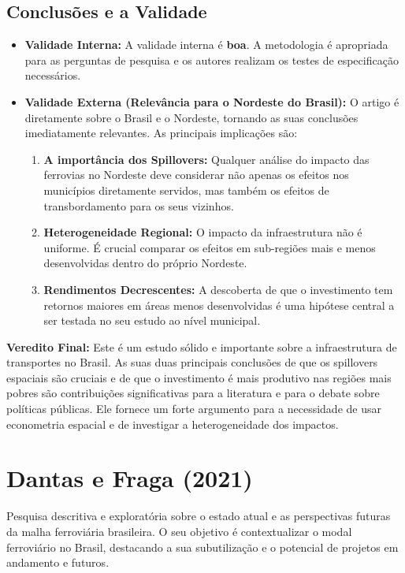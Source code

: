 \documentclass[12pt, a4paper]{article}
\begin{document}
\subsection{Conclusões e a Validade}
\begin{itemize}
    \item \textbf{Validade Interna:} A validade interna é \textbf{boa}. A metodologia é apropriada para as perguntas de pesquisa e os autores realizam os testes de especificação necessários.
    \item \textbf{Validade Externa (Relevância para o Nordeste do Brasil):} O artigo é diretamente sobre o Brasil e o Nordeste, tornando as suas conclusões imediatamente relevantes. As principais implicações são:
        \begin{enumerate}
            \item \textbf{A importância dos Spillovers:} Qualquer análise do impacto das ferrovias no Nordeste deve considerar não apenas os efeitos nos municípios diretamente servidos, mas também os efeitos de transbordamento para os seus vizinhos.
            \item \textbf{Heterogeneidade Regional:} O impacto da infraestrutura não é uniforme. É crucial comparar os efeitos em sub-regiões mais e menos desenvolvidas dentro do próprio Nordeste.
            \item \textbf{Rendimentos Decrescentes:} A descoberta de que o investimento tem retornos maiores em áreas menos desenvolvidas é uma hipótese central a ser testada no seu estudo ao nível municipal.
        \end{enumerate}
\end{itemize}

\noindent\textbf{Veredito Final:} Este é um estudo sólido e importante sobre a infraestrutura de transportes no Brasil. As suas duas principais conclusões de que os spillovers espaciais são cruciais e de que o investimento é mais produtivo nas regiões mais pobres são contribuições significativas para a literatura e para o debate sobre políticas públicas. Ele fornece um forte argumento para a necessidade de usar econometria espacial e de investigar a heterogeneidade dos impactos.

\section{Dantas e Fraga (2021)}
Pesquisa descritiva e exploratória sobre o estado atual e as perspectivas futuras da malha ferroviária brasileira. O seu objetivo é contextualizar o modal ferroviário no Brasil, destacando a sua subutilização e o potencial de projetos em andamento e futuros.
\end{document}
